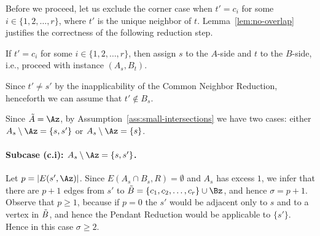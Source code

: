 Before we proceed, let us exclude the corner case when $t'=c_i$ for some $i\in \{1,2,\ldots,r\}$, where $t'$ is the unique neighbor of $t$. Lemma~\ref{lem:no-overlap} justifies the correctness of the following reduction step.

\begin{reductionstep}
If $t'=c_i$ for some $i\in \{1,2,\ldots,r\}$, then assign $s$ to the $A$-side and $t$ to the $B$-side, i.e., proceed with instance $(A_s,B_t)$.
\end{reductionstep}

Since $t'\neq s'$ by the inapplicability of the Common Neighbor Reduction, henceforth we can assume that $t'\notin B_s$. 

Since $\Atr=\Az$, by Assumption~\ref{ass:small-intersections} we have two cases: either $A_s \setminus \Az=\{s,s'\}$ or $A_s \setminus \Az=\{s\}$.

\paragraph*{Subcase (c.i): $A_s\setminus \Az=\{s,s'\}$.} 

Let $p=|E(s',\Az)|$. Since $E(A_s \cap B_s, R) = \emptyset$ and $A_s$ has excess $1$, we infer that there are $p+1$ edges from $s'$ to $\Btr=\{c_1,c_2,\ldots,c_r\}\cup \Bz$, and hence $\sigma=p+1$. Observe that $p\geq 1$, because if $p=0$ the $s'$ would be adjacent only to $s$ and to a vertex in $\tilde{B}$, and hence the Pendant Reduction would be applicable to $\{s'\}$. Hence in this case $\sigma\geq 2$.


